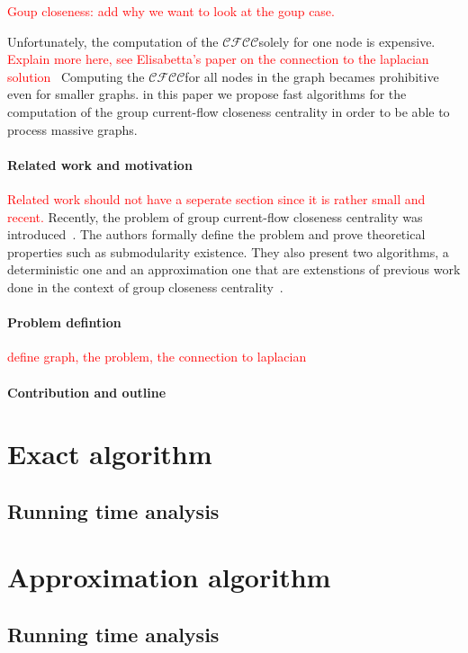 \documentclass[10pt, conference, compsocconf]{IEEEtran}
\newcommand{\cfc}{$\mathcal{CFCC}$}
\newcommand{\mpre}[1]{\textcolor{red}{#1}\xspace}
\begin{document}
\mpre{Goup closeness: add why we want to look at the goup case. }

Unfortunately, the computation of the \cfc solely for one node is expensive.
\mpre{Explain more here, see Elisabetta's paper on the connection to the laplacian solution~\cite{Bergamini16}}
Computing the \cfc for all nodes in the graph becames prohibitive even for smaller graphs.
in this paper we propose fast algorithms for the computation of the group current-flow
closeness centrality in order to be able to process massive graphs.


\paragraph{Related work and motivation}
\mpre{Related work should not have a seperate section since it is rather small and recent.}
Recently, the problem of group current-flow closeness centrality was introduced~\cite{Li18}.
The authors formally define the problem and prove theoretical properties such as submodularity existence.
They also present two algorithms, a deterministic one and an approximation one that
are extenstions of previous work done in the context of group closeness centrality~\cite{Bergamini18}.


\paragraph{Problem defintion}
\mpre{define graph, the problem, the connection to laplacian}
\paragraph{Contribution and outline}

\section{Exact algorithm}
\label{sec:multiSwap}
\subsection{Running time analysis}

\section{Approximation algorithm}
\label{sec:multiSwap}
\subsection{Running time analysis}
\end{document}
